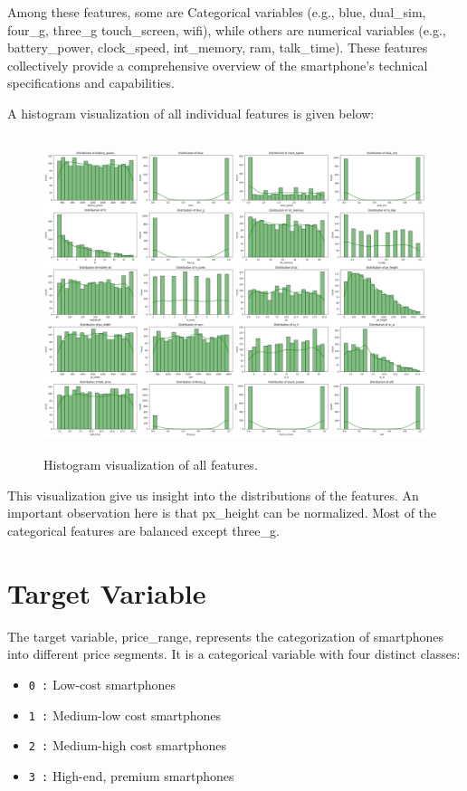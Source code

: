 \documentclass[12pt]{report}
\begin{document}
Among these features, some are Categorical variables (e.g., blue, dual\_sim, four\_g, three\_g touch\_screen, wifi), while others are numerical variables (e.g., battery\_power, clock\_speed, int\_memory, ram, talk\_time). These features collectively provide a comprehensive overview of the smartphone's technical specifications and capabilities.

A histogram visualization of all individual features is given below:
\begin{figure}[H]
	\centering
	\includegraphics[height=25em]{all_feature_viz.png}
	\caption{Histogram visualization of all features.}
	\label{all_feature_viz}
\end{figure}
This visualization give us insight into the distributions of the features. An important observation here is that px\_height can be normalized. Most of the categorical features are balanced except three\_g.

\section{Target Variable}
The target variable, price\_range, represents the categorization of smartphones into different price segments. It is a categorical variable with four distinct classes:
\vspace{-1.25em}
\begin{itemize}
	\setlength\itemsep{-1.05em}
	\item{\texttt{0 :}} Low-cost smartphones
	\item{\texttt{1 :}} Medium-low cost smartphones
	\item{\texttt{2 :}} Medium-high cost smartphones
	\item{\texttt{3 :}} High-end, premium smartphones
\end{itemize}
\end{document}
